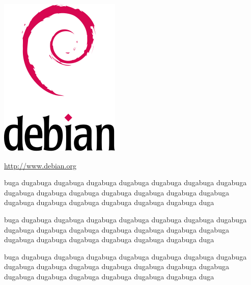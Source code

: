 \documentclass[letterpaper,landscape]{report}
\begin{document}
\begin{multicols}{3}    %

\begin{center}
\noindent
\includegraphics[width=0.5\columnwidth]{openlogo}

\url{http://www.debian.org}
\end{center}


buga dugabuga dugabuga dugabuga dugabuga dugabuga dugabuga dugabuga dugabuga dugabuga dugabuga dugabuga dugabuga dugabuga dugabuga dugabuga dugabuga dugabuga dugabuga dugabuga dugabuga duga
\columnbreak

buga dugabuga dugabuga dugabuga dugabuga dugabuga dugabuga dugabuga dugabuga dugabuga dugabuga dugabuga dugabuga dugabuga dugabuga dugabuga dugabuga dugabuga dugabuga dugabuga dugabuga duga
\columnbreak

buga dugabuga dugabuga dugabuga dugabuga dugabuga dugabuga dugabuga dugabuga dugabuga dugabuga dugabuga dugabuga dugabuga dugabuga dugabuga dugabuga dugabuga dugabuga dugabuga dugabuga duga
\columnbreak
\end{multicols}


\pagebreak
\end{document}
